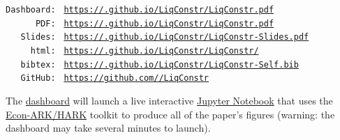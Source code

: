 \documentclass[titlepage]{\econtex}
\begin{document}
\begin{small}
  \parbox{\textwidth}{
    \begin{center}
      \begin{tabbing}
        \texttt{Dashboard:~} \= \= \texttt{\href{https://econ-ark.org/materials/LiqConstr?dashboard}{https://\owner.github.io/LiqConstr/LiqConstr.pdf}} \\
        \texttt{~~~~~~PDF:~} \> \> \texttt{\href{https://\owner.github.io/LiqConstr/LiqConstr.pdf}{https://\owner.github.io/LiqConstr/LiqConstr.pdf}} \\
        \texttt{~~~Slides:~} \> \> \texttt{\href{https://\owner.github.io/LiqConstr/LiqConstr-Slides.pdf}{https://\owner.github.io/LiqConstr/LiqConstr-Slides.pdf}} \\
        \texttt{~~~~~html:~} \> \> \texttt{\href{https://\owner.github.io/LiqConstr/LiqConstr/}{https://\owner.github.io/LiqConstr/LiqConstr/}}    \\
        \texttt{~~~bibtex:~} \> \> \texttt{\href{https://\owner.github.io/LiqConstr/LiqConstr-Self.bib}{https://\owner.github.io/LiqConstr/LiqConstr-Self.bib}}  \\
        \texttt{~~~GitHub:~} \> \> \texttt{\href{https://github.com/\owner/LiqConstr}{https://github.com/\owner/LiqConstr}} \\
      \end{tabbing}
    \end{center}

    The \href{https://econ-ark.org/materials/LiqConstr?dashboard}{dashboard} will launch a live interactive \href{https://en.wikipedia.org/wiki/Project\_Jupyter\#Jupyter_Notebook}{Jupyter Notebook} that uses the \href{https://econ-ark/HARK}{Econ-ARK/HARK} toolkit to produce all of the paper's figures (warning: the dashboard may take several minutes to launch).
  } %
\end{small}
\end{document}
